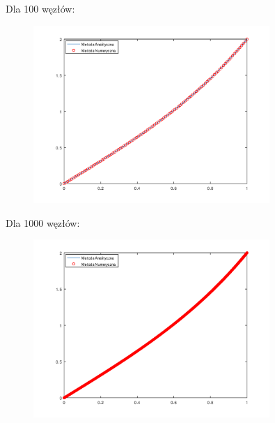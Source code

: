 \newpage
\begin{samepage}
    
Dla 100 węzłów:
\begin{figure}[!ht]
    \begin{center}
    \includegraphics[width=0.8\textwidth]{Lab4/charts/zad1/zad1_n_100.png}
    \end{center}
\end{figure}
\FloatBarrier
\end{samepage}
    
\begin{samepage}
Dla 1000 węzłów:

\begin{figure}[!ht]
    \begin{center}
    \includegraphics[width=0.8\textwidth]{Lab4/charts/zad1/zad1_n_1000.png}
    \end{center}
\end{figure}
\FloatBarrier
\end{samepage}    

